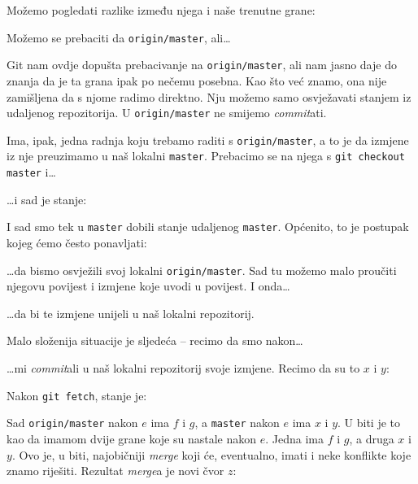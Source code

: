 Možemo pogledati razlike između njega i naše trenutne grane:


Možemo se prebaciti da \verb+origin/master+, ali\dots



Git nam ovdje dopušta prebacivanje na \verb+origin/master+, ali nam jasno daje do znanja da je ta grana ipak po nečemu posebna.
Kao što već znamo, ona nije zamišljena da s njome radimo direktno.
Nju možemo samo osvježavati stanjem iz udaljenog repozitorija.
U \verb+origin/master+ ne smijemo \emph{commit}ati.

Ima, ipak, jedna radnja koju trebamo raditi s \verb+origin/master+, a to je da izmjene iz nje preuzimamo u naš lokalni \verb+master+.
Prebacimo se na njega s \verb+git checkout master+ i\dots{}


\dots{}i sad je stanje:



I sad smo tek u \verb+master+ dobili stanje udaljenog \verb+master+.
Općenito, to je postupak kojeg ćemo često ponavljati:


\dots{}da bismo osvježili svoj lokalni \verb+origin/master+.
Sad tu možemo malo proučiti njegovu povijest i izmjene koje uvodi u povijest.
I onda\dots


\dots{}da bi te izmjene unijeli u naš lokalni repozitorij.

Malo složenija situacije je sljedeća -- recimo da smo nakon\dots{}



\dots{}mi \emph{commit}ali u naš lokalni repozitorij svoje izmjene. Recimo da su to $x$ i $y$:



Nakon \verb+git fetch+, stanje je:



Sad \verb+origin/master+ nakon $e$ ima $f$ i $g$, a \verb+master+ nakon $e$ ima $x$ i $y$.
U biti je to kao da imamom dvije grane koje su nastale nakon $e$. Jedna ima $f$ i $g$, a druga $x$ i $y$.
Ovo je, u biti, najobičniji \emph{merge} koji će, eventualno, imati i neke konflikte koje znamo riješiti.
Rezultat \emph{merge}a je novi čvor $z$:

